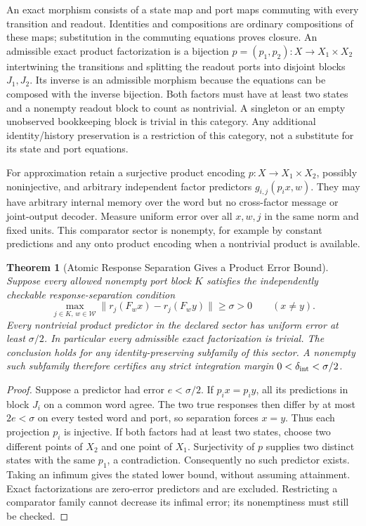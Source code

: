 \documentclass[11pt,a4paper]{article}
\newtheorem{theorem}{Theorem}[section]
\theoremstyle{definition}
\begin{document}
An exact morphism consists of a state map and port maps commuting with every
transition and readout. Identities and compositions are ordinary compositions
of these maps; substitution in the commuting equations proves closure. An
admissible exact product factorization is a bijection
$p=(p_1,p_2):X\to X_1\times X_2$ intertwining the transitions and splitting
the readout ports into disjoint blocks $J_1,J_2$. Its inverse is an admissible
morphism because the equations can be composed with the inverse bijection.
Both factors must have at least two states and a nonempty readout block to
count as nontrivial. A singleton or an empty unobserved bookkeeping block is
trivial in this category. Any additional identity/history preservation is a
restriction of this category, not a substitute for its state and port equations.

For approximation retain a surjective product encoding $p:X\to X_1\times X_2$,
possibly noninjective, and arbitrary independent factor predictors
$g_{i,j}(p_i x,w)$. They may have arbitrary internal memory over the word but
no cross-factor message or joint-output decoder. Measure uniform error over
all $x,w,j$ in the same norm and fixed units. This comparator sector is
nonempty, for example by constant predictions and any onto product encoding
when a nontrivial product is available.

\begin{theorem}[Atomic Response Separation Gives a Product Error Bound]
\label{thm:response-atomic-factorization}
Suppose every allowed nonempty port block $K$ satisfies the independently
checkable response-separation condition
\[
 \max_{j\in K,\,w\in\mathcal W}
 \|r_j(F_wx)-r_j(F_wy)\|\ge\sigma>0\qquad(x\ne y).
\]
Every nontrivial product predictor in the declared sector has uniform error
at least $\sigma/2$. In particular every admissible exact factorization is
trivial. The conclusion holds for any identity-preserving subfamily of this
sector. A nonempty such subfamily therefore certifies any strict integration
margin $0<\delta_{\rm int}<\sigma/2$.
\end{theorem}
\begin{proof}
Suppose a predictor had error $e<\sigma/2$. If $p_i x=p_i y$, all its predictions
in block $J_i$ on a common word agree. The two true responses then differ by
at most $2e<\sigma$ on every tested word and port, so separation forces $x=y$.
Thus each projection $p_i$ is injective. If both factors had at least two
states, choose two different points of $X_2$ and one point of $X_1$.
Surjectivity of $p$ supplies two distinct states with the same $p_1$, a
contradiction. Consequently no such predictor exists. Taking an infimum gives
the stated lower bound, without assuming attainment. Exact factorizations
are zero-error predictors and are excluded. Restricting a comparator family
cannot decrease its infimal error; its nonemptiness must still be checked.
\end{proof}
\end{document}
